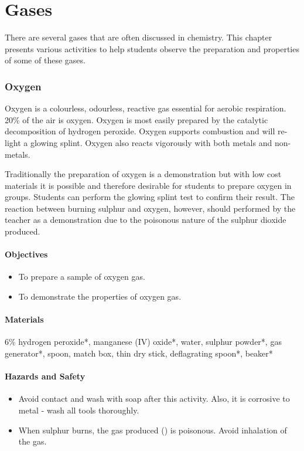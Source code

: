 \chapter{Gases}

There are several gases that are often discussed in chemistry. This chapter presents various activities to help students observe the preparation and properties of some of these gases.

\subsection{Oxygen}

Oxygen is a colourless, odourless, reactive gas essential for aerobic respiration. 20\% of the air is oxygen. Oxygen is most easily prepared by the catalytic decomposition of hydrogen peroxide. Oxygen supports combustion and will re-light a glowing splint. Oxygen also reacts vigorously with both metals and non-metals.

Traditionally the preparation of oxygen is a demonstration but with low cost materials it is possible and therefore desirable for students to prepare oxygen in groups. Students can perform the glowing splint test to confirm their result. The reaction between burning sulphur and oxygen, however, should performed by the teacher as a demonstration due to the poisonous nature of the sulphur dioxide produced.

\subsubsection*{Objectives}
\begin{itemize}
\item{To prepare a sample of oxygen gas.}
\item{To demonstrate the properties of oxygen gas.}
\end{itemize}

\subsubsection*{Materials}
6\% hydrogen peroxide*, manganese (IV) oxide*, water, sulphur powder*, gas generator*, spoon, match box, thin dry stick, deflagrating spoon*, beaker*

\subsubsection*{Hazards and Safety}
\begin{itemize}
\item{Avoid contact and wash with soap after this activity. Also, it is corrosive to metal - wash all tools thoroughly.}
\item{When sulphur burns, the gas produced () is poisonous. Avoid inhalation of the gas.}
\end{itemize}

